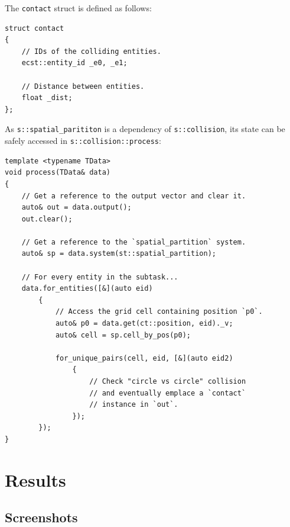 \documentclass[oneside, 12pt, a4paper, openany]{book}
\begin{document}
The
\texttt{contact}
struct is defined as follows:

\begin{verbatim}
struct contact
{
    // IDs of the colliding entities.
    ecst::entity_id _e0, _e1;

    // Distance between entities.
    float _dist;
};
\end{verbatim}

As
\texttt{s::spatial_parititon}
is a dependency of
\texttt{s::collision},
its state can be safely accessed in
\texttt{s::collision::process}:

\begin{verbatim}
template <typename TData>
void process(TData& data)
{
    // Get a reference to the output vector and clear it.
    auto& out = data.output();
    out.clear();

    // Get a reference to the `spatial_partition` system.
    auto& sp = data.system(st::spatial_partition);

    // For every entity in the subtask...
    data.for_entities([&](auto eid)
        {
            // Access the grid cell containing position `p0`.
            auto& p0 = data.get(ct::position, eid)._v;
            auto& cell = sp.cell_by_pos(p0);

            for_unique_pairs(cell, eid, [&](auto eid2)
                {
                    // Check "circle vs circle" collision
                    // and eventually emplace a `contact`
                    // instance in `out`.
                });
        });
}
\end{verbatim}

\section{Results}\label{results}

\subsection{Screenshots}\label{screenshots}
\end{document}
